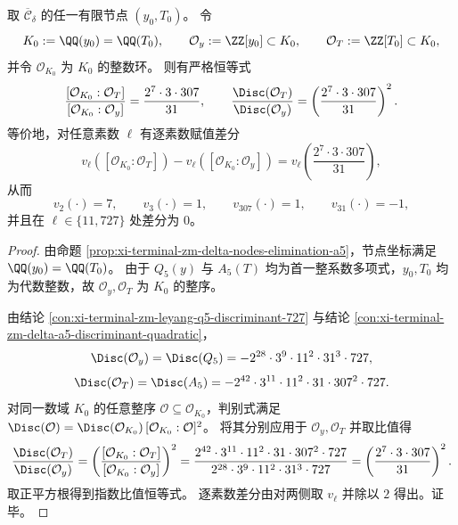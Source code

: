 \begin{theorem}[节点坐标域上两条单生成整序的判别式与指数比值]\label{thm:xi-terminal-zm-delta-node-order-discriminant-index-ratio}
取 \(\overline{\mathcal C}_\delta\) 的任一有限节点 \((y_0,T_0)\)。
令
\[
K_0:=\QQ(y_0)=\QQ(T_0),
\qquad
\mathcal O_y:=\ZZ[y_0]\subset K_0,
\qquad
\mathcal O_T:=\ZZ[T_0]\subset K_0,
\]
并令 \(\mathcal O_{K_0}\) 为 \(K_0\) 的整数环。
则有严格恒等式
\[
\frac{[\mathcal O_{K_0}:\mathcal O_T]}{[\mathcal O_{K_0}:\mathcal O_y]}
=\frac{2^{7}\cdot 3\cdot 307}{31},
\qquad
\frac{\Disc(\mathcal O_T)}{\Disc(\mathcal O_y)}
=\left(\frac{2^{7}\cdot 3\cdot 307}{31}\right)^2.
\]
等价地，对任意素数 \(\ell\) 有逐素数赋值差分
\[
v_\ell([\mathcal O_{K_0}:\mathcal O_T]) - v_\ell([\mathcal O_{K_0}:\mathcal O_y])
=
v_\ell\!\left(\frac{2^{7}\cdot 3\cdot 307}{31}\right),
\]
从而
\[
v_2(\cdot)=7,\qquad v_3(\cdot)=1,\qquad v_{307}(\cdot)=1,\qquad v_{31}(\cdot)=-1,
\]
并且在 \(\ell\in\{11,727\}\) 处差分为 \(0\)。
\end{theorem}
\begin{proof}
由命题 \ref{prop:xi-terminal-zm-delta-nodes-elimination-a5}，节点坐标满足 \(\QQ(y_0)=\QQ(T_0)\)。
由于 \(Q_5(y)\) 与 \(A_5(T)\) 均为首一整系数多项式，\(y_0,T_0\) 均为代数整数，故 \(\mathcal O_y,\mathcal O_T\) 为 \(K_0\) 的整序。
\par
由结论 \ref{con:xi-terminal-zm-leyang-q5-discriminant-727} 与结论 \ref{con:xi-terminal-zm-delta-a5-discriminant-quadratic}，
\[
\Disc(\mathcal O_y)=\Disc(Q_5)
=-2^{28}\cdot 3^{9}\cdot 11^{2}\cdot 31^{3}\cdot 727,
\]
\[
\Disc(\mathcal O_T)=\Disc(A_5)
=-2^{42}\cdot 3^{11}\cdot 11^{2}\cdot 31\cdot 307^{2}\cdot 727.
\]
对同一数域 \(K_0\) 的任意整序 \(\mathcal O\subseteq \mathcal O_{K_0}\)，判别式满足
\(
\Disc(\mathcal O)=\Disc(\mathcal O_{K_0})\,[\mathcal O_{K_0}:\mathcal O]^2
\)。
将其分别应用于 \(\mathcal O_y,\mathcal O_T\) 并取比值得
\[
\frac{\Disc(\mathcal O_T)}{\Disc(\mathcal O_y)}
=\left(\frac{[\mathcal O_{K_0}:\mathcal O_T]}{[\mathcal O_{K_0}:\mathcal O_y]}\right)^2
=\frac{2^{42}\cdot 3^{11}\cdot 11^{2}\cdot 31\cdot 307^{2}\cdot 727}{2^{28}\cdot 3^{9}\cdot 11^{2}\cdot 31^{3}\cdot 727}
=\left(\frac{2^{7}\cdot 3\cdot 307}{31}\right)^2.
\]
取正平方根得到指数比值恒等式。
逐素数差分由对两侧取 \(v_\ell\) 并除以 \(2\) 得出。证毕。
\end{proof}

\endinput
